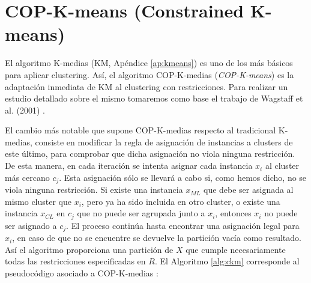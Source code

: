 \section{COP-K-means (Constrained K-means)} \label{copkm}

El algoritmo K-medias (\acs{KM}, Apéndice \ref{ap:kmeans}) es uno de los más básicos para aplicar clustering. Así, el algoritmo COP-K-medias (\textit{COP-K-means}) es la adaptación inmediata de \acs{KM} al clustering con restricciones. Para realizar un estudio detallado sobre el mismo tomaremos como base el trabajo de Wagstaff et al. (2001) \cite{Wagstaff:2001b}.

El cambio más notable que supone COP-K-medias respecto al tradicional K-medias, consiste en modificar la regla de asignación de instancias a clusters de este último, para comprobar que dicha asignación no viola ninguna restricción. De esta manera, en cada iteración se intenta asignar cada instancia $x_i$ al cluster más cercano $c_j$. Esta asignación sólo se llevará a cabo si, como hemos dicho, no se viola ninguna restricción. Si existe una instancia $x_{ML}$ que debe ser asignada al mismo cluster que $x_i$, pero ya ha sido incluida en otro cluster, o existe una instancia $x_{CL}$ en $c_j$ que no puede ser agrupada junto a $x_i$, entonces $x_i$ no puede ser asignado a $c_j$. El proceso continúa hasta encontrar una asignación legal para $x_i$, en caso de que no se encuentre se devuelve la partición vacía como resultado. Así el algoritmo proporciona una partición de $X$ que cumple necesariamente todas las restricciones especificadas en $R$. El Algoritmo \ref{alg:ckm} corresponde al pseudocódigo asociado a COP-K-medias \cite{Wagstaff:2001b}:


